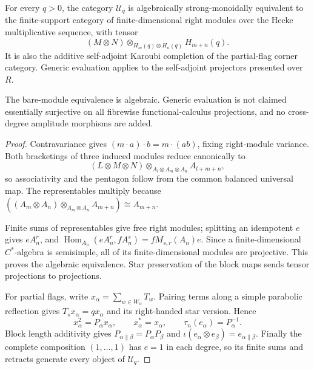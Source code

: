 \begin{theorem}
{\normalfont\statusProved}\quad For every $q>0$, the category $\mathcal U_q$
is algebraically strong-monoidally equivalent to the finite-support category
of finite-dimensional right modules over the Hecke multiplicative sequence,
with tensor
\[
 (M\otimes N)\otimes_{H_m(q)\otimes H_n(q)}H_{m+n}(q).
\]
It is also the additive self-adjoint Karoubi completion of the partial-flag
corner category.  Generic evaluation applies to the self-adjoint projectors
presented over $R$.
\end{theorem}
\begin{scope}
The bare-module equivalence is algebraic.  Generic evaluation is not claimed
essentially surjective on all fibrewise functional-calculus projections, and
no cross-degree amplitude morphisms are added.
\end{scope}
\begin{proof}
Contravariance gives $(m\cdot a)\cdot b=m\cdot(ab)$, fixing right-module
variance.  Both bracketings of three induced modules reduce canonically to
\[
 (L\otimes M\otimes N)
 \otimes_{A_l\otimes A_m\otimes A_n}A_{l+m+n},
\]
so associativity and the pentagon follow from the common balanced universal
map.  The representables multiply because
$((A_m\otimes A_n)\otimes_{A_m\otimes A_n}A_{m+n})\cong A_{m+n}$.

Finite sums of representables give free right modules; splitting an
idempotent $e$ gives $eA_n^r$, and
$\operatorname{Hom}_{A_n}(eA_n^r,fA_n^s)=fM_{s,r}(A_n)e$.  Since a
finite-dimensional $C^*$-algebra is semisimple, all of its finite-dimensional
modules are projective.  This proves the algebraic equivalence.  Star
preservation of the block maps sends tensor projections to projections.

For partial flags, write $x_\alpha=\sum_{w\in W_\alpha}T_w$.  Pairing terms
along a simple parabolic reflection gives $T_sx_\alpha=qx_\alpha$ and its
right-handed star version.  Hence
\[
 x_\alpha^2=P_\alpha x_\alpha,\qquad x_\alpha^*=x_\alpha,\qquad
 \tau_n(e_\alpha)=P_\alpha^{-1}.
\]
Block length additivity gives
$P_{\alpha\mathbin{\|}\beta}=P_\alpha P_\beta$ and
$\iota(e_\alpha\otimes e_\beta)=e_{\alpha\mathbin{\|}\beta}$.
Finally the complete composition $(1,\ldots,1)$ has $e=1$ in each degree,
so its finite sums and retracts generate every object of $\mathcal U_q$.
\end{proof}


